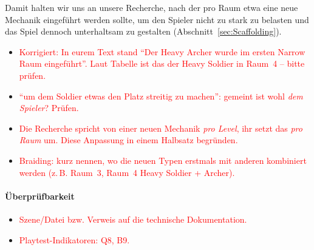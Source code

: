 \documentclass[../Main.tex]{subfiles}
\begin{document}
Damit halten wir uns an unsere Recherche, nach der pro Raum etwa eine neue Mechanik eingeführt werden sollte, um den Spieler nicht zu stark zu belasten und das Spiel dennoch unterhaltsam zu gestalten (Abschnitt~\ref{sec:Scaffolding}).

\begin{itemize}[leftmargin=1.5cm]
    \item \textcolor{red}{Korrigiert: In eurem Text stand \enquote{Der Heavy Archer wurde im ersten Narrow Raum eingeführt}. Laut Tabelle ist das der Heavy Soldier in Raum~4 -- bitte prüfen.}
    \item \textcolor{red}{\enquote{um dem Soldier etwas den Platz streitig zu machen}: gemeint ist wohl \emph{dem Spieler}? Prüfen.}
    \item \textcolor{red}{Die Recherche spricht von einer neuen Mechanik \emph{pro Level}, ihr setzt das \emph{pro Raum} um. Diese Anpassung in einem Halbsatz begründen.}
    \item \textcolor{red}{Braiding: kurz nennen, wo die neuen Typen erstmals mit anderen kombiniert werden (z.\,B. Raum~3, Raum~4 Heavy Soldier + Archer).}
\end{itemize}

\paragraph{Überprüfbarkeit}
\begin{itemize}[leftmargin=1.5cm]
    \item \textcolor{red}{Szene/Datei bzw. Verweis auf die technische Dokumentation.}
    \item \textcolor{red}{Playtest-Indikatoren: Q8, B9.}
\end{itemize}
\end{document}
